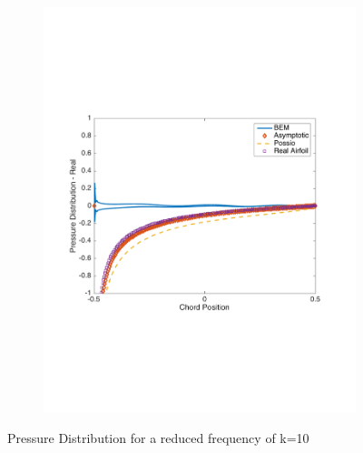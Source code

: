 \documentclass{article}
\begin{document}
\begin{figure}[h]
\begin{subfigure}{0.33\textwidth}
	\includegraphics[width = \textwidth, height=0.2\textheight]{pressure_k10real}
\end{subfigure}%
\caption{Pressure Distribution for a reduced frequency of k=10}
\end{figure}
\end{document}
